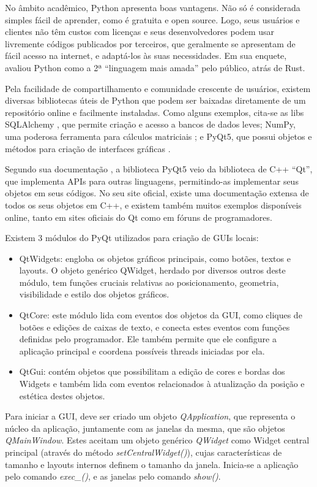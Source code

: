 No âmbito acadêmico, Python apresenta boas vantagens. Não só é considerada simples fácil de aprender, como é gratuita e open source. Logo, seus usuários e clientes não têm custos com licenças e seus desenvolvedores podem usar livremente códigos publicados por terceiros, que geralmente se apresentam de fácil acesso na internet, e adaptá-los às suas necessidades. Em sua enquete,  avaliou Python como a 2ª “linguagem mais amada” pelo público, atrás de Rust.

Pela facilidade de compartilhamento e comunidade crescente de usuários, existem diversas bibliotecas úteis de Python que podem ser baixadas diretamente de um repositório online e facilmente instaladas. Como alguns exemplos, cita-se as libs SQLAlchemy \cite{sqlalchemy}, que permite criação e acesso a bancos de dados leves; NumPy, uma poderosa ferramenta para cálculos matriciais \cite{harris2020array}; e PyQt5, que possui objetos e métodos para criação de interfaces gráficas \cite{pyqtdoc}.

Segundo sua documentação \cite{pyqtdoc}, a biblioteca PyQt5 veio da biblioteca de C++ “Qt”, que implementa APIs para outras linguagens, permitindo-as implementar seus objetos em seus códigos. No seu site oficial, existe uma documentação extensa de todos os seus objetos em C++, e existem também muitos exemplos disponíveis online, tanto em sites oficiais do Qt como em fóruns de programadores.

Existem 3 módulos do PyQt utilizados para criação de GUIs locais:

\begin{itemize}
	\item QtWidgets: engloba os objetos gráficos principais, como botões, textos e layouts. O objeto genérico QWidget, herdado por diversos outros deste módulo, tem funções cruciais relativas ao posicionamento, geometria, visibilidade e estilo dos objetos gráficos.
	\item QtCore: este módulo lida com eventos dos objetos da GUI, como cliques de botões e edições de caixas de texto, e conecta estes eventos com funções definidas pelo programador. Ele também permite que ele configure a aplicação principal e coordena possíveis threads iniciadas por ela.
	\item QtGui: contém objetos que possibilitam a edição de cores e bordas dos Widgets e também lida com eventos relacionados à atualização da posição e estética destes objetos.
\end{itemize}

Para iniciar a GUI, deve ser criado um objeto \emph{QApplication}, que representa o núcleo da aplicação, juntamente com as janelas da mesma, que são objetos \emph{QMainWindow}. Estes aceitam um objeto genérico \emph{QWidget} como Widget central principal (através do método \emph{setCentralWidget()}), cujas características de tamanho e layouts internos definem o tamanho da janela. Inicia-se a aplicação pelo comando \emph{exec\_()}, e as janelas pelo comando \emph{show()}.

